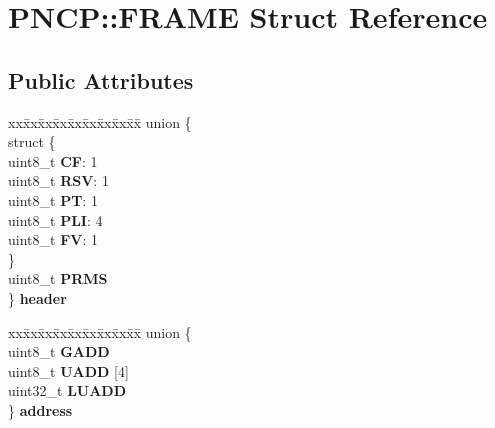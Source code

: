 \hypertarget{struct_p_n_c_p_1_1_f_r_a_m_e}{}\section{P\+N\+CP\+:\+:F\+R\+A\+ME Struct Reference}
\label{struct_p_n_c_p_1_1_f_r_a_m_e}
\subsection*{Public Attributes}
\begin{DoxyCompactItemize}
\item 
\mbox{\label{struct_p_n_c_p_1_1_f_r_a_m_e_a78193000e93eb9f756c36b0bcb122ff8}} 
\begin{tabbing}
xx\=xx\=xx\=xx\=xx\=xx\=xx\=xx\=xx\=\kill
union \{\\
\mbox{\label{union_p_n_c_p_1_1_f_r_a_m_e_1_1_0D0_adc5cad8974c31676c959095bcd1502f6}} 
\>struct \{\\
\>\>uint8\_t {\bfseries CF}: 1\\
\>\>uint8\_t {\bfseries RSV}: 1\\
\>\>uint8\_t {\bfseries PT}: 1\\
\>\>uint8\_t {\bfseries PLI}: 4\\
\>\>uint8\_t {\bfseries FV}: 1\\
\>\} \\
\>uint8\_t {\bfseries PRMS}\\
\} {\bfseries header}\\

\end{tabbing}\item 
\mbox{\label{struct_p_n_c_p_1_1_f_r_a_m_e_a741208bf03db8c66bbf2965189eeeb6a}} 
\begin{tabbing}
xx\=xx\=xx\=xx\=xx\=xx\=xx\=xx\=xx\=\kill
union \{\\
\>uint8\_t {\bfseries GADD}\\
\>uint8\_t {\bfseries UADD} \mbox{[}4\mbox{]}\\
\>uint32\_t {\bfseries LUADD}\\
\} {\bfseries address}\\


\end{tabbing}
\end{DoxyCompactItemize}
